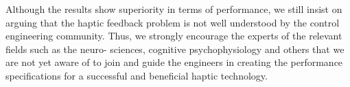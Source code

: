 Although the results show superiority in terms of performance, we still insist on arguing that the haptic feedback problem is not well 
understood by the control engineering community. Thus, we strongly encourage the experts of the relevant fields such as the neuro-
sciences, cognitive psychophysiology and others that we are not yet aware of to join and guide the engineers in creating the performance 
specifications for a successful and beneficial haptic technology.
%
%
%
